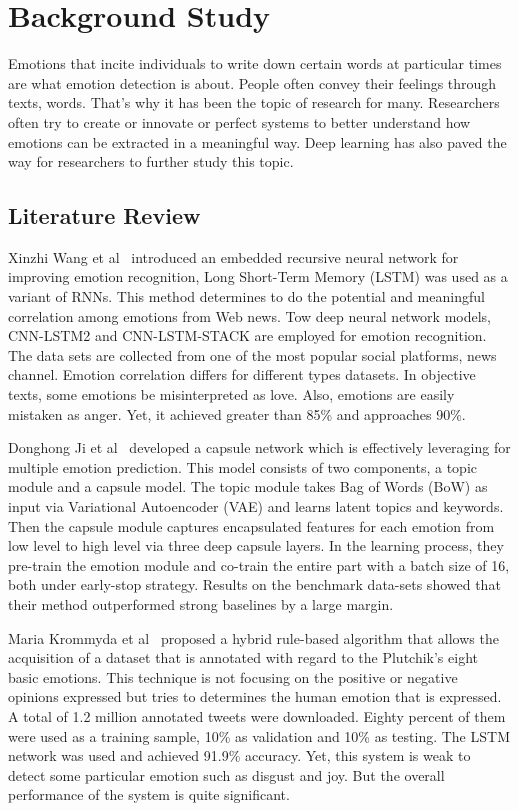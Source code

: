 \chapter{Background Study} \label{ch:literature_review}


Emotions that incite individuals to write down certain words at particular times are what emotion detection is about. People often convey their feelings through texts, words. That's why it has been the topic of research for many. Researchers often try to create or innovate or perfect systems to better understand how emotions can be extracted in a meaningful way. Deep learning has also paved the way for researchers to further study this topic.
\section{Literature Review}


Xinzhi Wang et al~\cite{ref1} introduced an embedded recursive neural network for improving emotion recognition, Long Short-Term Memory (LSTM) was used as a variant of RNNs. This method determines to do the potential and meaningful correlation among emotions from Web news. Tow deep neural network models, CNN-LSTM2 and CNN-LSTM-STACK are employed for emotion recognition. The data sets are collected from one of the most popular social platforms, news channel. Emotion correlation differs for different types datasets. In objective texts, some emotions be misinterpreted as love. Also, emotions are easily mistaken as anger. Yet, it achieved greater than 85\% and approaches 90\%.



Donghong Ji et al~\cite{ref2} developed a capsule network which is effectively leveraging for multiple emotion prediction. This model consists of two components, a topic module and a capsule model. The topic module takes Bag of Words (BoW) as input via Variational Autoencoder (VAE) and learns latent topics and keywords. Then the capsule module captures encapsulated features for each emotion from low level to high level via three deep capsule layers. In the learning process, they pre-train the emotion module and co-train the entire part with a batch size of 16, both under early-stop strategy. Results on the benchmark data-sets showed that their method outperformed strong baselines by a large margin.

Maria Krommyda et al~\cite{ref3} proposed a hybrid rule-based algorithm that allows the acquisition of a dataset that is annotated with regard to the Plutchik's eight basic emotions. This technique is not focusing on the positive or negative opinions expressed but tries to determines the human emotion that is expressed. A total of 1.2 million annotated tweets were downloaded. Eighty percent of them were used as a training sample, 10\% as validation and 10\% as testing. The LSTM network was used and achieved 91.9\% accuracy. Yet, this system is weak to detect some particular emotion such as disgust and joy. But the overall performance of the system is quite significant. 


